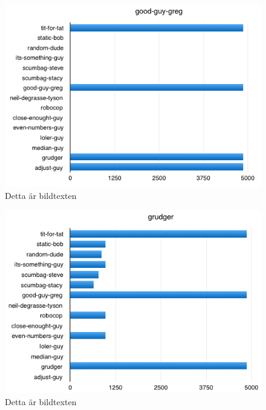 \begin{figure}[htb]
	\begin{center}
	\includegraphics[scale=0.75, angle=0]{bilder/good-guy-greg.png}
	\caption{Detta är bildtexten}
	\label{good-guy-greg}
	\end{center}
\end{figure}

\begin{figure}[htb]
	\begin{center}
	\includegraphics[scale=0.75, angle=0]{bilder/grudger.png}
	\caption{Detta är bildtexten}
	\label{grudger}
	\end{center}
\end{figure}

